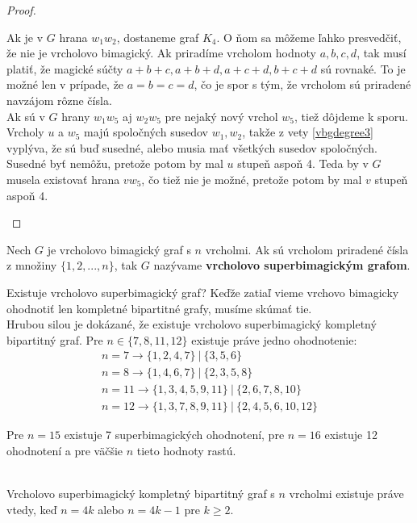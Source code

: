 \begin{proof}
\begin{enumerate}
Ak je v $G$ hrana $w_1 w_2$, dostaneme graf $K_4$. O ňom sa môžeme ľahko presvedčiť, že nie je vrcholovo bimagický. Ak priradíme vrcholom hodnoty $a,b,c,d$, tak musí platiť, že magické súčty $a+b+c, a+b+d, a+c+d, b+c+d$ sú rovnaké. To je možné len v prípade, že $a = b = c = d$, čo je spor s tým, že vrcholom sú priradené navzájom rôzne čísla. \\

Ak sú v $G$ hrany $w_1 w_5$ aj $w_2 w_5$ pre nejaký nový vrchol $w_5$, tiež dôjdeme k sporu. Vrcholy $u$ a $w_5$ majú spoločných susedov $w_1, w_2$, takže z vety \ref{vbgdegree3} vyplýva, že sú buď susedné, alebo musia mať všetkých susedov spoločných. Susedné byť nemôžu, pretože potom by mal $u$ stupeň aspoň 4. Teda by v $G$ musela existovať hrana $v w_5$, čo tiež nie je možné, pretože potom by mal $v$ stupeň aspoň 4.
\end{enumerate}

\end{proof}

\begin{subdefinition} Nech $G$ je vrcholovo bimagický graf s $n$ vrcholmi. Ak sú vrcholom priradené čísla z množiny $\{1, 2, ... , n\}$, tak $G$ nazývame \textbf{vrcholovo superbimagickým grafom}.
\end{subdefinition} 

Existuje vrcholovo superbimagický graf? Keďže zatiaľ vieme vrchovo bimagicky ohodnotiť len kompletné bipartitné grafy, musíme skúmať tie. \\

Hrubou silou je dokázané, že existuje vrcholovo superbimagický kompletný bipartitný graf. Pre $n \in \{7, 8, 11, 12\}$ existuje práve jedno ohodnotenie:
\begin{gather}
n = 7 \rightarrow \{1, 2, 4, 7\} ~|~ \{3, 5, 6\} \\
n = 8 \rightarrow \{1, 4, 6, 7\} ~|~ \{2, 3, 5, 8\} \\
n = 11 \rightarrow \{1, 3, 4, 5, 9, 11\} ~|~ \{2, 6, 7, 8, 10\} \\
n = 12 \rightarrow \{1, 3, 7, 8, 9, 11\} ~|~ \{2, 4, 5, 6, 10, 12\}
\end{gather}

Pre $n = 15$ existuje 7 superbimagických ohodnotení, pre $n = 16$ existuje 12 ohodnotení a pre väčšie $n$ tieto hodnoty rastú. \\\\

\begin{subtheorem}
\label{vsbgkij}
Vrcholovo superbimagický kompletný bipartitný graf s $n$ vrcholmi existuje práve vtedy, keď $n = 4k$ alebo $n = 4k-1$ pre $k \geq 2$.
\end{subtheorem}

